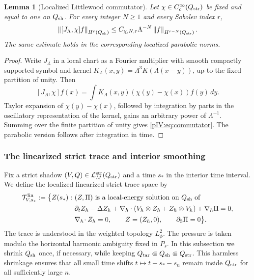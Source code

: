 \documentclass[11pt]{article}
\numberwithin{equation}{section}
\theoremstyle{plain}
\newtheorem{lemma}{Lemma}[section]
\theoremstyle{definition}
\theoremstyle{remark}
\newcommand{\nabh}{\nabla_h}
\newcommand{\divh}{\nabla_h\!\cdot}
\newcommand{\norm}[2]{\left\|#1\right\|_{#2}}
\newcommand{\Lstr}{\mathcal L^{\rm str}}
\newcommand{\Tlin}{\mathcal T^{\rm lin}}
\begin{document}
\begin{lemma}[Localized Littlewood commutator]\label{pIV:lem:lp-commutator}
Let \(\chi\in C_c^\infty(Q_{\rm str})\) be fixed and equal to one on
\(Q_{\rm sh}\).  For every integer \(N\ge1\) and every Sobolev index \(r\),
\begin{equation}\label{pIV:eq:commutator}
        \norm{[J_\Lambda,\chi]f}{H^r(Q_{\rm sh})}
        \le C_{\chi,N,r}\Lambda^{-N}
        \norm{f}{H^{r-N}(Q_{\rm str})}.
\end{equation}
The same estimate holds in the corresponding localized parabolic norms.
\end{lemma}

\begin{proof}
Write \(J_\Lambda\) in a local chart as a Fourier multiplier with smooth compactly
supported symbol and kernel \(K_\Lambda(x,y)=\Lambda^3K(\Lambda(x-y))\), up to the
fixed partition of unity.  Then
\[
        [J_\Lambda,\chi]f(x)
        =\int K_\Lambda(x,y)(\chi(y)-\chi(x))f(y)\,dy .
\]
Taylor expansion of \(\chi(y)-\chi(x)\), followed by integration by parts in the
oscillatory representation of the kernel, gains an arbitrary power of
\(\Lambda^{-1}\).  Summing over the finite partition of unity gives
\eqref{pIV:eq:commutator}.  The parabolic version follows after integration in time.
\end{proof}

\subsubsection{The linearized strict trace and interior smoothing}

Fix a strict shadow \((V,Q)\in\Lstr_M(Q_{\rm str})\) and a time \(s_*\) in the
interior time interval.  We define the localized linearized strict trace space by
\begin{equation}\label{pIV:eq:Tlin-def}
\begin{aligned}
\Tlin_{V,s_*}:=\bigl\{ Z(s_*):\ &(Z,\Pi)\text{ is a local-energy solution on }
Q_{\rm sh}\text{ of}\\
&\partial_t Z_h-\Delta Z_h
 +\nabh\cdot(V_h\otimes Z_h+Z_h\otimes V_h)+\nabh\Pi=0,\\
&\divh Z_h=0,\qquad Z=(Z_h,0),\qquad \partial_3\Pi=0\bigr\}.
\end{aligned}
\end{equation}
The trace is understood in the weighted topology \(L^2_\phi\).  The pressure is
taken modulo the horizontal harmonic ambiguity fixed in \(P_s\).  In this subsection
we shrink \(Q_{\rm sh}\) once, if necessary, while keeping
\(Q_{\rm tar}\Subset Q_{\rm sh}\Subset Q_{\rm str}\).  This harmless shrinkage ensures
that all small time shifts \(t\mapsto t+s_*-s_n\) remain inside \(Q_{\rm str}\) for
all sufficiently large \(n\).
\end{document}
